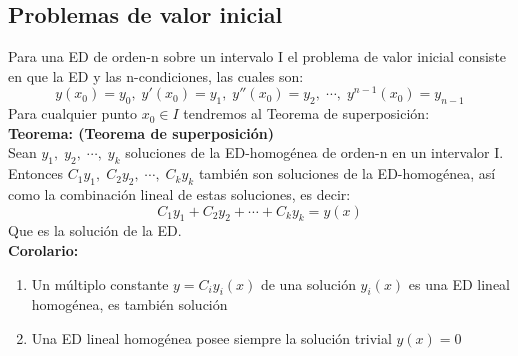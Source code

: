 \documentclass[10pt]{article}
\begin{document}
\subsection{Problemas de valor inicial}
Para una ED de orden-n sobre un intervalo I el problema de valor inicial consiste en que la ED y las n-condiciones, las cuales son:
\[y(x_{0})=y_{0},\;y'(x_{0})=y_{1},\;y''(x_{0})=y_{2},\;\cdots,\;y^{n-1}(x_{0})=y_{n-1}\]
Para cualquier punto $x_{0}\in I$ tendremos al Teorema de superposición:\\
\textbf{Teorema: (Teorema de superposición)}\\
Sean \(\displaystyle y_{1},\;y_{2},\;\cdots,\;y_{k}\) soluciones de la ED-homogénea de orden-n en un intervalor I.\\
Entonces \(\displaystyle C_{1}y_{1},\;C_{2}y_{2},\;\cdots,\;C_{k}y_{k}\) también son soluciones de la ED-homogénea, así como la combinación lineal de estas soluciones, es decir:
\[C_{1}y_{1}+C_{2}y_{2}+\cdots+C_{k}y_{k}=y(x)\] Que es la solución de la ED.\\
\textbf{Corolario:}
\begin{enumerate}
  \item Un múltiplo constante \(\displaystyle y=C_{i}y_{i}(x)\) de una solución \(\displaystyle y_{i}(x)\) es una ED lineal homogénea, es también solución
  \item Una ED lineal homogénea posee siempre la solución trivial \(\displaystyle y(x)=0\)
\end{enumerate}
\end{document}
